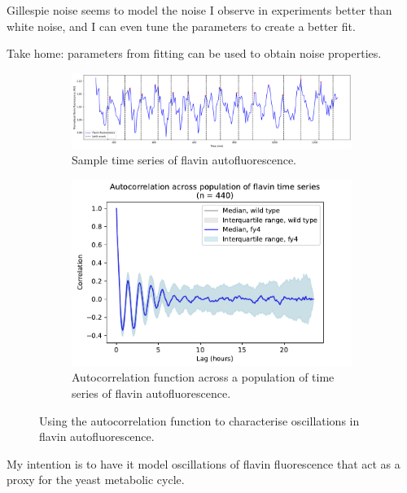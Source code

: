 Gillespie noise seems to model the noise I observe in experiments better than white noise, and I can even tune the parameters to create a better fit.

Take home: parameters from fitting can be used to obtain noise properties.

\begin{figure}
  \centering
  \begin{subfigure}[t]{0.7\textwidth}
  \centering
    \includegraphics[width=\linewidth]{26643_ts.png}
    \caption{
      Sample time series of flavin autofluorescence.
    }
    \label{fig:acf-sinusoid-biol-ts}
  \end{subfigure}

  \begin{subfigure}[t]{0.7\textwidth}
  \centering
    \includegraphics[width=\linewidth]{fy4_26643_plots_06.png}
    \caption{
      Autocorrelation function across a population of time series of flavin autofluorescence.
    }
    \label{fig:acf-sinusoid-biol-acf}
  \end{subfigure}

  \caption{
    Using the autocorrelation function to characterise oscillations in flavin autofluorescence.
  }
  \label{fig:acf-sinusoid-biol}
\end{figure}

My intention is to have it model oscillations of flavin fluorescence that act as a proxy for the yeast metabolic cycle.

